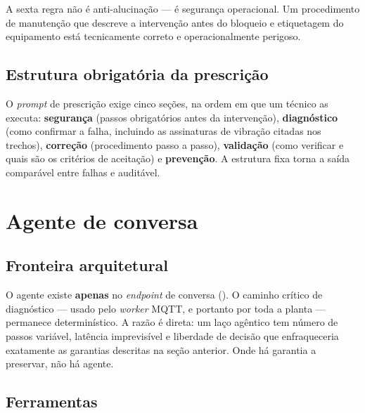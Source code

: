 A sexta regra não é anti-alucinação --- é segurança operacional. Um
procedimento de manutenção que descreve a intervenção antes do bloqueio e
etiquetagem do equipamento está tecnicamente correto e operacionalmente
perigoso.

\subsection{Estrutura obrigatória da prescrição}

O \textit{prompt} de prescrição exige cinco seções, na ordem em que um técnico
as executa: \textbf{segurança} (passos obrigatórios antes da intervenção),
\textbf{diagnóstico} (como confirmar a falha, incluindo as assinaturas de
vibração citadas nos trechos), \textbf{correção} (procedimento passo a passo),
\textbf{validação} (como verificar e quais são os critérios de aceitação) e
\textbf{prevenção}. A estrutura fixa torna a saída comparável entre falhas e
auditável.

\section{Agente de conversa}

\subsection{Fronteira arquitetural}

O agente existe \textbf{apenas} no \textit{endpoint} de conversa
(). O caminho crítico de diagnóstico --- usado pelo
\textit{worker} MQTT, e portanto por toda a planta --- permanece
determinístico. A razão é direta: um laço agêntico tem número de passos
variável, latência imprevisível e liberdade de decisão que enfraqueceria
exatamente as garantias descritas na seção anterior. Onde há garantia a
preservar, não há agente.

\subsection{Ferramentas}

